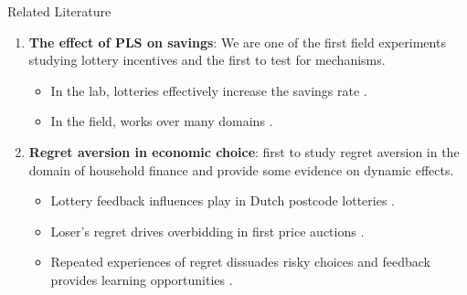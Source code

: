 \documentclass[aspectratio=169]{beamer}
\begin{document}
\begin{frame}{Related Literature}
	
	\begin{enumerate}

		\item \textbf{The effect of PLS on savings}: We are one of the first field experiments studying lottery incentives and the first to test for mechanisms.

		\begin{itemize}
			\item In the lab, lotteries effectively increase the savings rate \parencite{atalay_savings_2014,filiz-ozbay_lottery_2015}.
			\item In the field, works over many domains \parencite{dizon_leveraging_2016,gajic_cost-effectiveness_2011,brune_effect_2015,loibl_testing_2016,gertler_long-term_2017}.
		\end{itemize}

		\item \textbf{Regret aversion in economic choice}: first to study regret aversion in the domain of household finance and provide some evidence on dynamic effects.

		\begin{itemize}
			\item Lottery feedback influences play in Dutch postcode lotteries \parencite{zeelenberg_consequences_2004}.
			\item Loser's regret drives overbidding in first price auctions \parencite{filiz-ozbay_auctions_2007}.
			\item Repeated experiences of regret dissuades risky choices and feedback provides learning opportunities \parencite{imas_regret_2016}.
		\end{itemize}

	\end{enumerate}

\end{frame}



\end{document}
